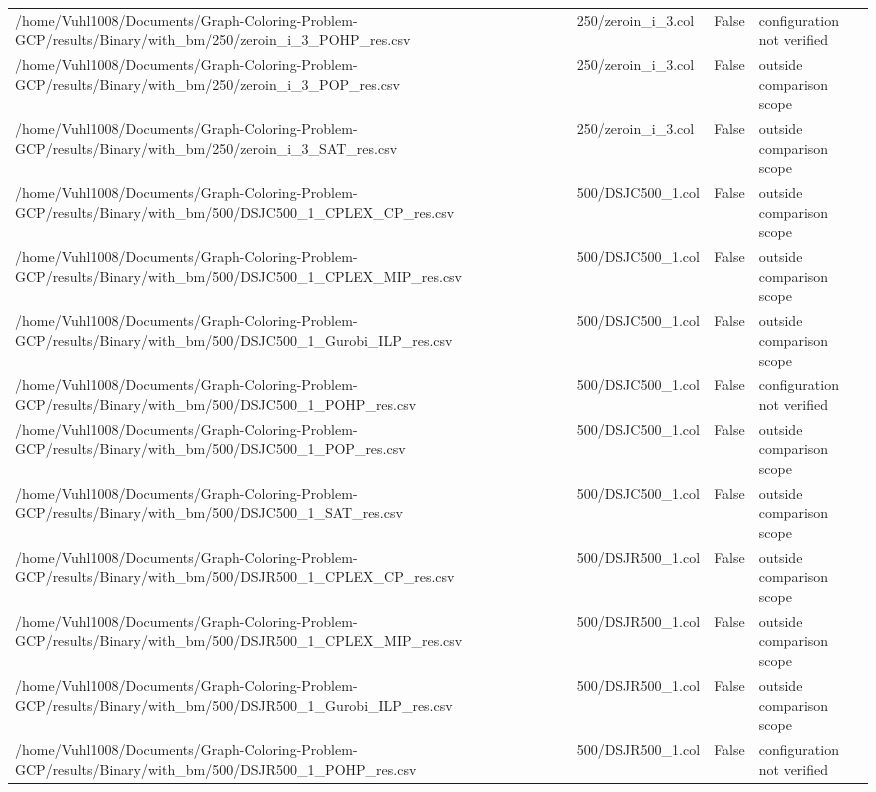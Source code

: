 \begin{table}[htbp]
\begin{tabular}{llll}
/home/Vuhl1008/Documents/Graph-Coloring-Problem-GCP/results/Binary/with\_bm/250/zeroin\_i\_3\_POHP\_res.csv & 250/zeroin\_i\_3.col & False & configuration not verified \\
/home/Vuhl1008/Documents/Graph-Coloring-Problem-GCP/results/Binary/with\_bm/250/zeroin\_i\_3\_POP\_res.csv & 250/zeroin\_i\_3.col & False & outside comparison scope \\
/home/Vuhl1008/Documents/Graph-Coloring-Problem-GCP/results/Binary/with\_bm/250/zeroin\_i\_3\_SAT\_res.csv & 250/zeroin\_i\_3.col & False & outside comparison scope \\
/home/Vuhl1008/Documents/Graph-Coloring-Problem-GCP/results/Binary/with\_bm/500/DSJC500\_1\_CPLEX\_CP\_res.csv & 500/DSJC500\_1.col & False & outside comparison scope \\
/home/Vuhl1008/Documents/Graph-Coloring-Problem-GCP/results/Binary/with\_bm/500/DSJC500\_1\_CPLEX\_MIP\_res.csv & 500/DSJC500\_1.col & False & outside comparison scope \\
/home/Vuhl1008/Documents/Graph-Coloring-Problem-GCP/results/Binary/with\_bm/500/DSJC500\_1\_Gurobi\_ILP\_res.csv & 500/DSJC500\_1.col & False & outside comparison scope \\
/home/Vuhl1008/Documents/Graph-Coloring-Problem-GCP/results/Binary/with\_bm/500/DSJC500\_1\_POHP\_res.csv & 500/DSJC500\_1.col & False & configuration not verified \\
/home/Vuhl1008/Documents/Graph-Coloring-Problem-GCP/results/Binary/with\_bm/500/DSJC500\_1\_POP\_res.csv & 500/DSJC500\_1.col & False & outside comparison scope \\
/home/Vuhl1008/Documents/Graph-Coloring-Problem-GCP/results/Binary/with\_bm/500/DSJC500\_1\_SAT\_res.csv & 500/DSJC500\_1.col & False & outside comparison scope \\
/home/Vuhl1008/Documents/Graph-Coloring-Problem-GCP/results/Binary/with\_bm/500/DSJR500\_1\_CPLEX\_CP\_res.csv & 500/DSJR500\_1.col & False & outside comparison scope \\
/home/Vuhl1008/Documents/Graph-Coloring-Problem-GCP/results/Binary/with\_bm/500/DSJR500\_1\_CPLEX\_MIP\_res.csv & 500/DSJR500\_1.col & False & outside comparison scope \\
/home/Vuhl1008/Documents/Graph-Coloring-Problem-GCP/results/Binary/with\_bm/500/DSJR500\_1\_Gurobi\_ILP\_res.csv & 500/DSJR500\_1.col & False & outside comparison scope \\
/home/Vuhl1008/Documents/Graph-Coloring-Problem-GCP/results/Binary/with\_bm/500/DSJR500\_1\_POHP\_res.csv & 500/DSJR500\_1.col & False & configuration not verified \\

\end{tabular}
\end{table}
